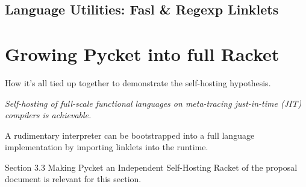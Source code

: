 		\subsection{Language Utilities: Fasl \& Regexp Linklets}

	\section{Growing Pycket into full Racket}

		\begin{mainpoint}
            How it's all tied up together to demonstrate the self-hosting hypothesis.

			\textit{Self-hosting of full-scale functional languages on meta-tracing just-in-time (JIT) compilers is achievable.}
        \end{mainpoint}

        \begin{todo}
			A rudimentary interpreter can be bootstrapped into a full language implementation by importing linklets into the runtime.
		\end{todo}

		\begin{todo}[Import]
			Section 3.3 Making Pycket an Independent Self-Hosting Racket of the proposal document is relevant for this section.
		\end{todo}